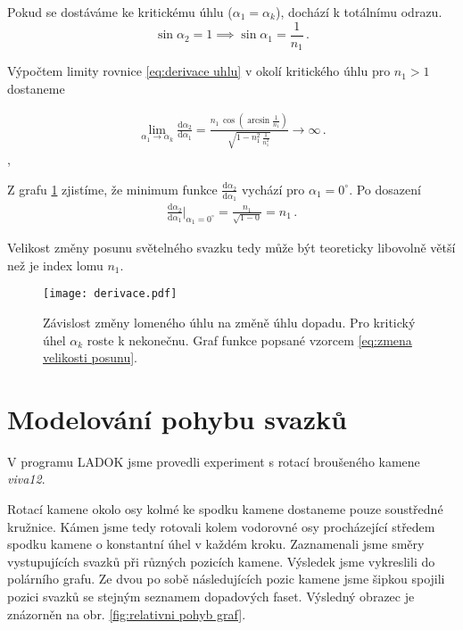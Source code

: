 Pokud se dostáváme ke kritickému úhlu ($\alpha_1 = \alpha_k$), dochází k totálnímu odrazu. 
\begin{equation}
 \sin\alpha_2 = 1 \implies \sin\alpha_1 = \frac{1}{n_1}\,.
\end{equation}

Výpočtem limity rovnice \ref{eq:derivace uhlu} v okolí kritického úhlu pro $ n_1 > 1$ dostaneme 

\begin{eqnarray}
\lim_{\alpha_1 \to \alpha_k}\frac{\mathrm{d}\alpha_2}{\mathrm{d}\alpha_1} = \frac{n_1\,\cos(\arcsin\frac{1}{n_1})}{\sqrt{1-n_1^2\,\frac{1}{n_1^2}}} \to \infty\,.
\label{eq:zmena velikosti posunu}  
\end{eqnarray},

Z grafu \ref{fig:derivace uhlu} zjistíme, že minimum funkce $\frac{\mathrm{d}\alpha_2}{\mathrm{d}\alpha_1}$ vychází pro $ \alpha_1 = 0^\circ $. Po dosazení
\begin{eqnarray}
{\frac{\mathrm{d}\alpha_2}{\mathrm{d}\alpha_1}}\biggr\rvert_{\alpha_1 = 0^\circ}= \frac{n_1}{\sqrt{1-0}} = n_1\,.
\end{eqnarray}


Velikost změny posunu světelného svazku tedy může být teoreticky libovolně větší než je index lomu $n_1$. 

\begin{figure}[h!]
\begin{center}
\texttt{[image: derivace.pdf]}
\end{center}
\caption[Závislost změny lomeného úhlu na změně úhlu dopadu.]{Závislost změny lomeného úhlu na změně úhlu dopadu. Pro kritický úhel $\alpha_k$ roste k nekonečnu. Graf funkce popsané vzorcem \ref{eq:zmena velikosti posunu}.}
\label{fig:derivace uhlu}
\end{figure}



\section{Modelování pohybu svazků}
V programu LADOK jsme provedli experiment s rotací broušeného kamene \textit{viva12}.

Rotací kamene okolo osy kolmé ke spodku kamene dostaneme pouze soustředné kružnice. Kámen jsme tedy rotovali kolem vodorovné osy procházející středem spodku kamene o konstantní úhel v každém kroku. Zaznamenali jsme směry vystupujících svazků při různých pozicích kamene. Výsledek jsme vykreslili do polárního grafu. Ze dvou po sobě následujících pozic kamene jsme šipkou spojili pozici svazků se stejným seznamem dopadových faset. Výsledný obrazec je znázorněn na obr. \ref{fig:relativni pohyb graf}.

